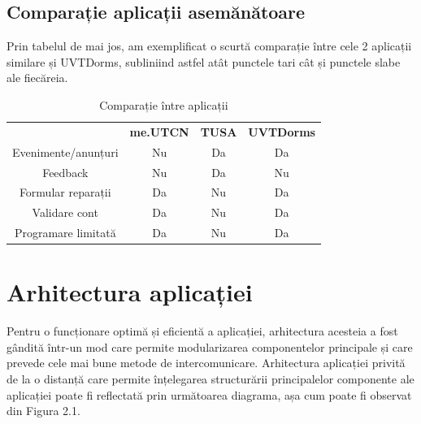 \documentclass[12pt,a4paper]{report}
\theoremstyle{definition}
\theoremstyle{remark}
\begin{document}
\vspace{15mm}

\section{Comparație aplicații asemănătoare}
\par Prin tabelul de mai jos, am exemplificat o scurtă comparație între cele 2 aplicații similare și UVTDorms, subliniind astfel atât punctele tari cât și punctele slabe ale fiecăreia.

\begin{table}[H]
    \centering
    \begin{tabular}{cccc}
        & \textbf{me.UTCN}         & \textbf{TUSA}  & \textbf{UVTDorms} \\
        Evenimente/anunțuri                            & Nu               & Da       &Da\\
        Feedback                                       & Nu               & Da       &Nu\\
        Formular reparații                             & Da               & Nu       &Da\\
        Validare cont                                  & Da               & Nu       &Da\\
        Programare limitată                            & Da               & Nu       &Da\\
    \end{tabular}
    \caption{Comparație între aplicații\label{comparatii-intre-aplicatii}}
\end{table}

\chapter{Arhitectura aplicației}
\par Pentru o funcționare optimă și eficientă a aplicației, arhitectura acesteia a fost gândită într-un mod care permite modularizarea componentelor principale și care prevede cele mai bune metode de intercomunicare. Arhitectura aplicației privită de la o distanță care permite înțelegarea structurării principalelor componente ale aplicației poate fi reflectată prin următoarea diagrama, așa cum poate fi observat din Figura 2.1.
\end{document}

